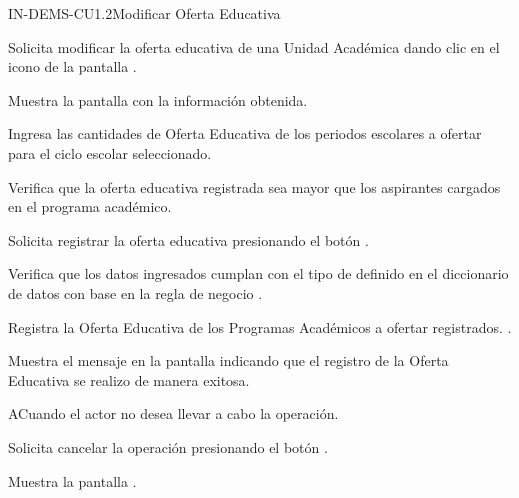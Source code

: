 \begin{UseCase}{IN-DEMS-CU1.2}{Modificar Oferta Educativa}




	
\end{UseCase}

\begin{UCtrayectoria}

	\UCpaso [\UCactor] Solicita modificar la oferta educativa de una Unidad Académica dando clic en el icono \IUEditar de la pantalla .

	\UCpaso Muestra la pantalla  con la información obtenida.
	
	\UCpaso [\UCactor] Ingresa las cantidades de Oferta Educativa de los periodos escolares a ofertar para el ciclo escolar seleccionado.
	
	\UCpaso Verifica que la oferta educativa registrada sea mayor que los aspirantes cargados en el programa académico. 
	
	\UCpaso [\UCactor] \label{IN-DEMS-CU1.2:Registrar} Solicita registrar la oferta educativa presionando el botón . 
	
	\UCpaso Verifica que los datos ingresados cumplan con el tipo de definido en el diccionario de datos con base en la regla de negocio . 
	
	\UCpaso Registra la Oferta Educativa de los Programas Académicos a ofertar registrados. .
	
	\UCpaso Muestra el mensaje  en la pantalla  indicando que el registro de la Oferta Educativa se realizo de manera exitosa.
	
\end{UCtrayectoria}


\begin{UCtrayectoriaA}{A}{Cuando el actor no desea llevar a cabo la operación.}

	\UCpaso [\UCactor] Solicita cancelar la operación presionando el botón .

	\UCpaso Muestra la pantalla .

\end{UCtrayectoriaA}
